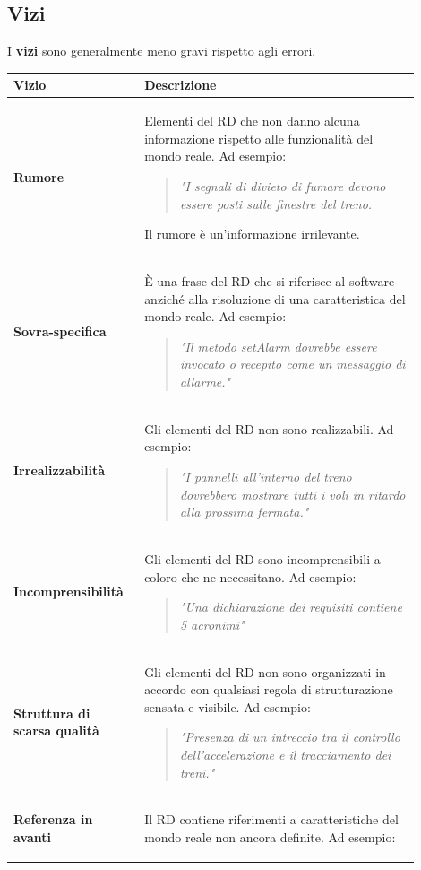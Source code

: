 \documentclass[italian]{article}
\begin{document}
		\subsection{Vizi}
		I \textbf{vizi} sono generalmente meno gravi rispetto agli errori.
		\begin{longtable}{|m{0.27\linewidth}|m{0.63\linewidth}|}
			\hline
			\textbf{Vizio} & \textbf{Descrizione}\\
			\hline
			\textbf{Rumore} & Elementi del RD che non danno alcuna informazione rispetto alle funzionalità del mondo reale. Ad esempio:
			\begin{verse}
				\textit{"I segnali di divieto di fumare devono essere posti sulle finestre del treno.}
			\end{verse}
			Il rumore è un'informazione irrilevante.
			\\
			\hline
			\textbf{Sovra-specifica} & È una frase del RD che si riferisce al software anziché alla risoluzione di una caratteristica del mondo reale. Ad esempio:
			\begin{verse}
				\textit{"Il metodo setAlarm dovrebbe essere invocato o recepito come un messaggio di allarme."}
			\end{verse}
			\\
			\hline
			\textbf{Irrealizzabilità} & Gli elementi del RD non sono realizzabili. Ad esempio:
			\begin{verse}
				\textit{"I pannelli all'interno del treno dovrebbero mostrare tutti i voli in ritardo alla prossima fermata."}
			\end{verse}
			\\
			\hline
			\textbf{Incomprensibilità}& Gli elementi del RD sono incomprensibili a coloro che ne necessitano. Ad esempio:
			\begin{verse}
				\textit{"Una dichiarazione dei requisiti contiene 5 acronimi"}
			\end{verse}\\
			\hline
			\textbf{Struttura di scarsa qualità} & Gli elementi del RD non sono organizzati in accordo con qualsiasi regola di strutturazione sensata e visibile. Ad esempio:
			\begin{quotation}
				\textit{"Presenza di un intreccio tra il controllo dell'accelerazione e il tracciamento dei treni."}
			\end{quotation}
			\\
			\hline
			\textbf{Referenza in avanti} & Il RD contiene riferimenti a caratteristiche del mondo reale non ancora definite. Ad esempio:
			\begin{verse}

\end{verse}
\end{longtable}
\end{document}
